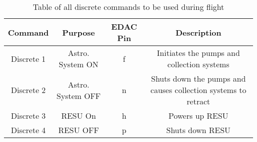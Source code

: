 \begin{table}[!ht]
\centering
\caption{Table of all discrete commands to be used during flight} 
\label{tab:Dis-Commands}
\bigskip
\begin{tabular}{|c|c|c|c|}
\hline
\multicolumn{1}{|c|}{\bfseries Command} & \multicolumn{1}{c|}{\bfseries Purpose} &  \multicolumn{1}{c|}{\bfseries EDAC Pin} & \multicolumn{1}{c|}{\bfseries Description} \\
\hline
    Discrete 1     	& Astro. System ON 	& f	 & Initiates the pumps and collection systems   \\ \hline 
    Discrete 2    	& Astro. System OFF 	& n	 &  Shuts down the pumps and causes collection systems to retract  \\ \hline
    Discrete 3  	& RESU On 	& h	 & Powers up RESU   \\ \hline 
    Discrete 4 		& RESU OFF 	& p	 & Shuts down RESU   \\ \hline
\end{tabular}
\medskip
\end{table}

